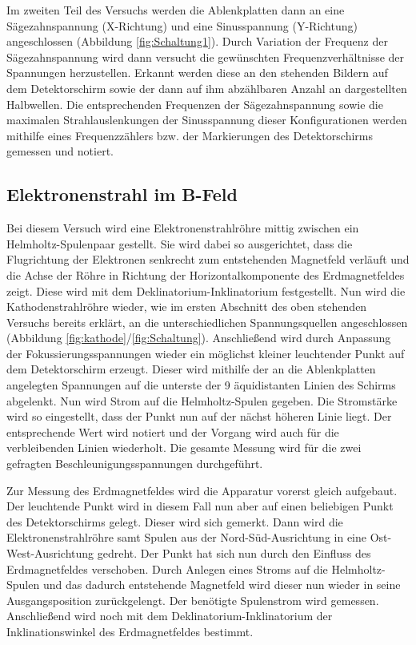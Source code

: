 Im zweiten Teil des Versuchs werden die Ablenkplatten dann an eine Sägezahnspannung (X-Richtung)
und eine Sinusspannung (Y-Richtung) angeschlossen (Abbildung \ref{fig:Schaltung1}). Durch Variation
der Frequenz der Sägezahnspannung wird dann versucht die gewünschten Frequenzverhältnisse
der Spannungen herzustellen. Erkannt werden diese an den stehenden Bildern auf dem
Detektorschirm sowie der dann auf ihm abzählbaren Anzahl an dargestellten Halbwellen.
Die entsprechenden Frequenzen der Sägezahnspannung sowie die maximalen Strahlauslenkungen der Sinusspannung
dieser Konfigurationen werden mithilfe eines Frequenzzählers bzw. der Markierungen des Detektorschirms
gemessen und notiert.


\subsection{Elektronenstrahl im B-Feld}
Bei diesem Versuch wird eine Elektronenstrahlröhre mittig zwischen ein Helmholtz-Spulenpaar gestellt.
Sie wird dabei so ausgerichtet, dass die Flugrichtung der Elektronen senkrecht zum entstehenden Magnetfeld
verläuft und die Achse der Röhre in Richtung der Horizontalkomponente des Erdmagnetfeldes zeigt. Diese
wird mit dem Deklinatorium-Inklinatorium festgestellt. Nun wird die Kathodenstrahlröhre wieder, wie im ersten
Abschnitt des oben stehenden Versuchs bereits erklärt, an die unterschiedlichen Spannungsquellen angeschlossen (Abbildung \ref{fig:kathode}/\ref{fig:Schaltung}).
Anschließend wird durch Anpassung der Fokussierungsspannungen wieder ein möglichst kleiner leuchtender Punkt auf
dem Detektorschirm erzeugt. Dieser wird mithilfe der an die Ablenkplatten angelegten Spannungen auf die unterste
der 9 äquidistanten Linien des Schirms abgelenkt. Nun wird Strom auf die Helmholtz-Spulen gegeben. Die Stromstärke
wird so eingestellt, dass der Punkt nun auf der nächst höheren Linie liegt. Der entsprechende Wert wird notiert und
der Vorgang wird auch für die verbleibenden Linien wiederholt. Die gesamte Messung wird für die zwei gefragten
Beschleunigungsspannungen durchgeführt.

Zur Messung des Erdmagnetfeldes wird die Apparatur vorerst gleich aufgebaut. Der leuchtende Punkt wird in diesem Fall
nun aber auf einen beliebigen Punkt des Detektorschirms gelegt. Dieser wird sich gemerkt. Dann wird die
Elektronenstrahlröhre samt Spulen aus der Nord-Süd-Ausrichtung in eine Ost-West-Ausrichtung gedreht. Der Punkt hat sich
nun durch den Einfluss des Erdmagnetfeldes verschoben. Durch Anlegen eines Stroms auf die Helmholtz-Spulen und das dadurch
entstehende Magnetfeld wird dieser nun wieder in seine Ausgangsposition zurückgelengt. Der benötigte Spulenstrom wird gemessen.
Anschließend wird noch mit dem Deklinatorium-Inklinatorium der Inklinationswinkel des Erdmagnetfeldes bestimmt.
